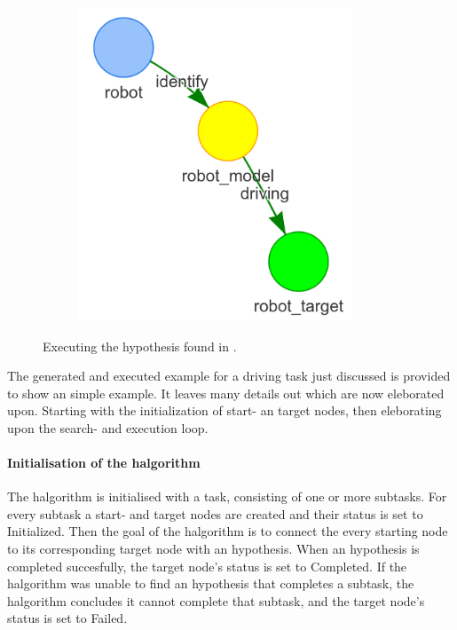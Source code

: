 \begin{figure}[H]
\begin{subfigure}{.3\textwidth}
    \end{subfigure}
    \begin{subfigure}{.3\textwidth}
    \centering
    \includegraphics[width=0.9\textwidth]{figures/proposed_method/connecting_nodes/robot_to_target/execute_robot_to_target_3}
    \end{subfigure}
    \caption{Executing the hypothesis found in .}
    \label{fig:execute_robot_to_target}
\end{figure}

The generated and executed example for a driving task just discussed is provided to show an simple example. It leaves many details out which are now eleborated upon. Starting with the initialization of start- an target nodes, then eleborating upon the search- and execution loop.\bs

\paragraph{Initialisation of the \ac{halgorithm}}
The \ac{halgorithm} is initialised with a task, consisting of one or more subtasks. For every subtask a start- and target nodes are created and their status is set to Initialized. Then the goal of the \ac{halgorithm} is to connect the every starting node to its corresponding target node with an hypothesis. When an hypothesis is completed succesfully, the target node's status is set to Completed. If the \ac{halgorithm} was unable to find an hypothesis that completes a subtask, the \ac{halgorithm} concludes it cannot complete that subtask, and the target node's status is set to Failed.\bs

